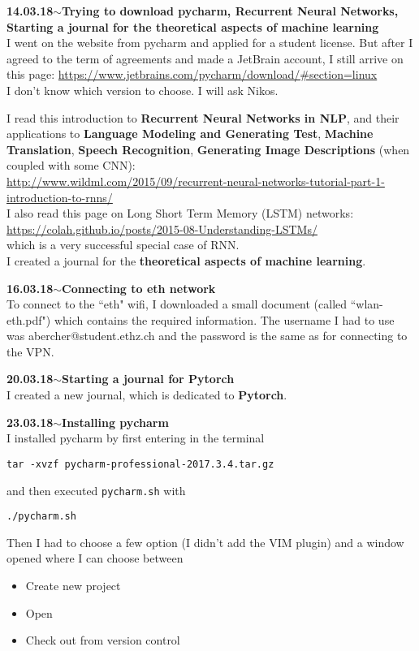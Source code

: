 \documentclass[11pt,a4paper]{article}
\newenvironment{loggentry}[2]%
{\noindent\textbf{#1}\hspace{1cm}$\mathbf{\sim}$\text{ }\textbf{#2}\\}{\vspace{0.5cm}}
\begin{document}
\begin{loggentry}{14.03.18}{Trying to download pycharm, Recurrent Neural Networks, Starting a journal for the theoretical aspects of machine learning}
I went on the website from pycharm and applied for a student license. But after I agreed to the term of agreements and made a JetBrain account, I still arrive on this page:
\url{https://www.jetbrains.com/pycharm/download/#section=linux}\\
I don't know which version to choose. I will ask Nikos.

I read this introduction to \textbf{Recurrent Neural Networks in NLP}, and their applications to \textbf{Language Modeling and Generating Test}, \textbf{Machine Translation}, \textbf{Speech Recognition}, \textbf{Generating Image Descriptions} (when coupled with some CNN):\\
\url{http://www.wildml.com/2015/09/recurrent-neural-networks-tutorial-part-1-introduction-to-rnns/}\\
I also read this page on Long Short Term Memory (LSTM) networks:\\
\url{https://colah.github.io/posts/2015-08-Understanding-LSTMs/}\\
which is a very successful special case of RNN.\\
I created a journal for the \textbf{theoretical aspects of machine learning}.
\end{loggentry}

\begin{loggentry}{16.03.18}{Connecting to eth network}
To connect to the ``eth" wifi, I downloaded a small document (called ``wlan-eth.pdf") which contains the required information. The username I had to use was abercher@student.ethz.ch and the password is the same as for connecting to the VPN.
\end{loggentry}

\begin{loggentry}{20.03.18}{Starting a journal for Pytorch}
I created a new journal, which is dedicated to \textbf{Pytorch}.
\end{loggentry}

\begin{loggentry}{23.03.18}{Installing pycharm}
I installed pycharm by first entering in the terminal
\begin{verbatim}
tar -xvzf pycharm-professional-2017.3.4.tar.gz
\end{verbatim}
and then executed \texttt{pycharm.sh} with
\begin{verbatim}
./pycharm.sh
\end{verbatim}
Then I had to choose a few option (I didn't add the VIM plugin) and a window opened where I can choose between\\
\begin{itemize}
\item Create new project
\item Open
\item Check out from version control
\end{itemize}
\end{loggentry}
\end{document}
